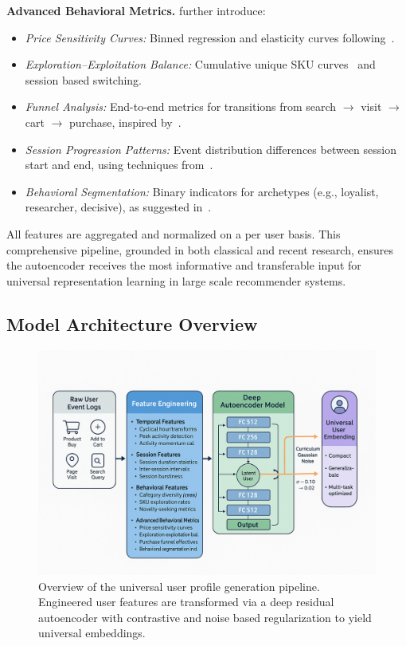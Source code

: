 \documentclass[sigconf]{acmart}
\begin{document}
\textbf{Advanced Behavioral Metrics.}
further introduce:
\begin{itemize}
    \item \textit{Price Sensitivity Curves:} Binned regression and elasticity curves following~\cite{Krasnova2018}.
    \item \textit{Exploration–Exploitation Balance:} Cumulative unique SKU curves~\cite{Cui2018} and session based switching.
    \item \textit{Funnel Analysis:} End-to-end metrics for transitions from search $\rightarrow$ visit $\rightarrow$ cart $\rightarrow$ purchase, inspired by~\cite{Covington2016}.
    \item \textit{Session Progression Patterns:} Event distribution differences between session start and end, using techniques from~\cite{Quadrana2017}.
    \item \textit{Behavioral Segmentation:} Binary indicators for archetypes (e.g., loyalist, researcher, decisive), as suggested in~\cite{Christoffel2022}.
\end{itemize}

All features are aggregated and normalized on a per user basis. This comprehensive pipeline, grounded in both classical and recent research, ensures the autoencoder receives the most informative and transferable input for universal representation learning in large scale recommender systems.


\subsection{Model Architecture Overview}
\begin{figure}[t]
  \centering
  \includegraphics[width=0.9\linewidth]{high.png}
  \caption{Overview of the universal user profile generation pipeline. Engineered user features are transformed via a deep residual autoencoder with contrastive and noise based regularization to yield universal embeddings.}
  \label{fig:architecture}
\end{figure}
\end{document}
